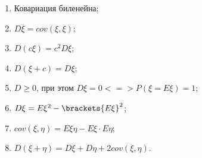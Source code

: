 \begin{lemma}
    \phantom{asdfa}
    \begin{enumerate}
        \item Ковариация биленейна;
        \item $D\xi = cov(\xi, \xi)$;
        \item $D(c\xi) = c^2D\xi$;
        \item $D(\xi + c) = D\xi$;
        \item $D \geq 0$, при этом $D\xi = 0 <=> P(\xi=E\xi)=1$;
        \item $D\xi = E\xi^2 - \brackets{E\xi}^2$;
        \item $cov(\xi, \eta) = E\xi\eta - E\xi \cdot E\eta$;
        \item $D(\xi + \eta) = D\xi + D\eta + 2cov(\xi, \eta)$.
    \end{enumerate}    
\end{lemma}